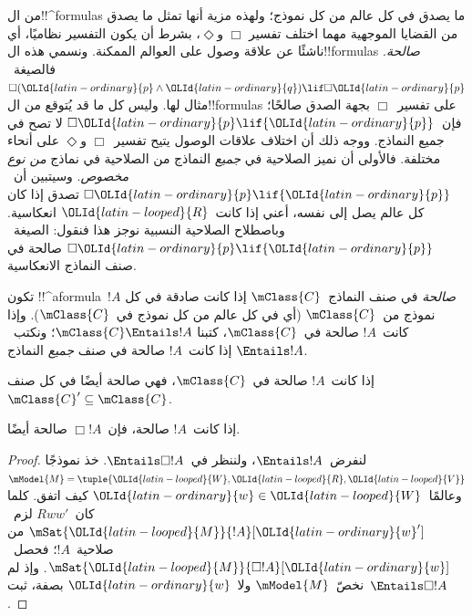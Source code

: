 \documentclass[../../../include/open-logic-section]{subfiles}
\begin{document}


\begin{explain}
  من ال!!^{formula}s ما يصدق في كل عالم من كل نموذج؛ ولهذه مزية
  أنها تمثل ما يصدق من القضايا الموجهية مهما اختلف تفسير
  $\Box$ و$\Diamond$، بشرط أن يكون التفسير نظاميًا، أي ناشئًا عن
  علاقة وصول على العوالم الممكنة. ونسمي هذه ال!!{formula}s
  \emph{صالحة}. فالصيغة~$\Box({\OLId{latin-ordinary}{p}} \land {\OLId{latin-ordinary}{q}}) \lif \Box {\OLId{latin-ordinary}{p}}$ مثال لها.
  وليس كل ما قد يُتوقع من ال!!{formula}s على تفسير~$\Box$ بجهة
  الصدق صالحًا؛ فإن~$\Box {\OLId{latin-ordinary}{p}} \lif {\OLId{latin-ordinary}{p}}$ لا تصح في جميع النماذج.
  ووجه ذلك أن اختلاف علاقات الوصول يتيح تفسير~$\Box$ و$\Diamond$
  على أنحاء مختلفة. فالأولى أن نميز الصلاحية في \emph{جميع}
  النماذج من الصلاحية في نماذج \emph{من نوع مخصوص}.
  وسيتبين أن~$\Box {\OLId{latin-ordinary}{p}} \lif {\OLId{latin-ordinary}{p}}$ تصدق إذا كان كل عالم يصل إلى نفسه،
  أعني إذا كانت~${\OLId{latin-looped}{R}}$ انعكاسية. وباصطلاح الصلاحية النسبية نوجز هذا
  فنقول: الصيغة~$\Box {\OLId{latin-ordinary}{p}} \lif {\OLId{latin-ordinary}{p}}$ صالحة في صنف النماذج الانعكاسية.
\end{explain}

\begin{defn}
  تكون !!^a{formula}~$!A$ \emph{صالحة} في صنف النماذج~$\mClass{C}$
  إذا كانت صادقة في كل نموذج من~$\mClass{C}$ (أي في كل عالم من كل
  نموذج في~$\mClass{C}$). وإذا كانت~$!A$ صالحة في~$\mClass{C}$، كتبنا
  $\mClass{C} \Entails !A$؛ ونكتب~$\Entails !A$ إذا كانت~$!A$ صالحة
  في صنف \emph{جميع} النماذج.
\end{defn}

\begin{prop}
  إذا كانت~$!A$ صالحة في~$\mClass{C}$، فهي صالحة أيضًا في كل صنف
  $\mClass{C}' \subseteq \mClass{C}$.
\end{prop}

\begin{prop}
  إذا كانت~$!A$ صالحة، فإن~$\Box!A$ صالحة أيضًا.
\end{prop}

\begin{proof}
  لنفرض~$\Entails !A$، ولننظر في~$\Entails \Box!A$. خذ نموذجًا
  $\mModel{M} = \tuple{{\OLId{latin-looped}{W}}, {\OLId{latin-looped}{R}}, {\OLId{latin-looped}{V}}}$ وعالمًا~${\OLId{latin-ordinary}{w}} \in {\OLId{latin-looped}{W}}$ كيف اتفق.
  كلما كان~$Rww'$ لزم~$\mSat{{\OLId{latin-looped}{M}}}{!A}[{\OLId{latin-ordinary}{w}}']$ من صلاحية~$!A$؛
  فحصل~$\mSat{{\OLId{latin-looped}{M}}}{\Box!A}[{\OLId{latin-ordinary}{w}}]$. وإذ لم نخصّ~$\mModel{M}$ ولا~${\OLId{latin-ordinary}{w}}$
  بصفة، ثبت~$\Entails \Box!A$.
\end{proof}
\end{document}
